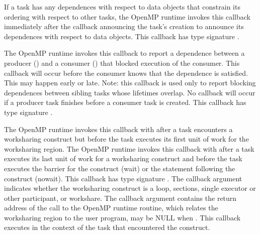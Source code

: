 \documentclass{article}
\newcommand{\descheader}[1]{{\needspace{3\baselineskip}\vspace{1em}\noindent \fbox{#1}}}
\begin{document}
\begin{description}
\sloppy


\item {}

  If a task has any dependences with respect to data objects that constrain its ordering with respect to other tasks, 
  the OpenMP runtime invokes this callback immediately after the callback announcing the task's creation to announce its dependences with respect to data objects. 
  This callback has type signature .
  
\item {}

The OpenMP runtime invokes this callback to report a dependence between a producer () 
and a consumer () that blocked execution of the consumer.
This callback will occur before the consumer knows that the dependence is satisfied. This may happen early or late.
Note: this callback is used only to report blocking dependences between sibling tasks whose lifetimes overlap. 
No callback will occur if a producer task finishes before a consumer task is created.
This callback has type signature . 
\end{description}


\descheader{Worksharing}

\begin{description}

\item {}

\sloppy
The OpenMP runtime invokes this callback with  after a task encounters a worksharing 
construct but before the task executes its first unit of work for the worksharing region. 
The OpenMP runtime invokes this callback with  after a task executes 
its last unit of work for a worksharing construct and before the task executes the barrier  for the construct (wait) or the statement following the construct (nowait).
This callback has type signature .
The  callback argument indicates whether the worksharing construct is a loop, sections, single executor or other participant, 
or workshare.
The  callback argument contains the return address of the call to the OpenMP runtime routine, which relates the worksharing region to the user program,
may be NULL when .
This callback executes in the context of the task that encountered the construct. 

\end{description}
\end{document}
